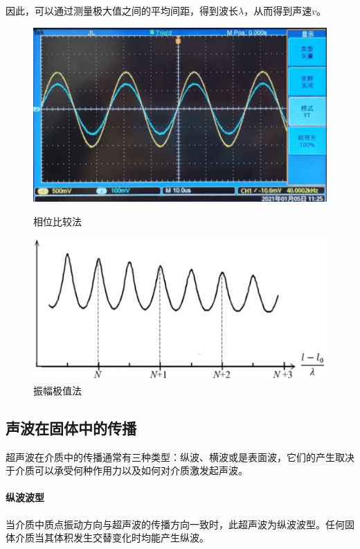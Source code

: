 \documentclass[UTF8,a4paper]{article}%
\begin{document}
因此，可以通过测量极大值之间的平均间距，得到波长$\lambda$，从而得到声速$v$。
\begin{figure}[H] %
    \centering
    \begin{minipage}[t]{0.5\linewidth}
        \centering
        \includegraphics[width=0.95\linewidth]{phase.png}
        \caption{相位比较法}
        \label{fg:phase}
    \end{minipage}%
    \begin{minipage}[t]{0.5\linewidth}
        \centering
        \includegraphics[width=0.95\linewidth]{amplitude.png}
        \caption{振幅极值法}
        \label{fg:amplitude}
    \end{minipage}
\end{figure}
\subsection{声波在固体中的传播}
超声波在介质中的传播通常有三种类型：纵波、横波或是表面波，它们的产生取决于介质可以承受何种作用力以及如何对介质激发起声波。
\paragraph{纵波波型}
当介质中质点振动方向与超声波的传播方向一致时，此超声波为纵波波型。任何固体介质当其体积发生交替变化时均能产生纵波。
\end{document}
